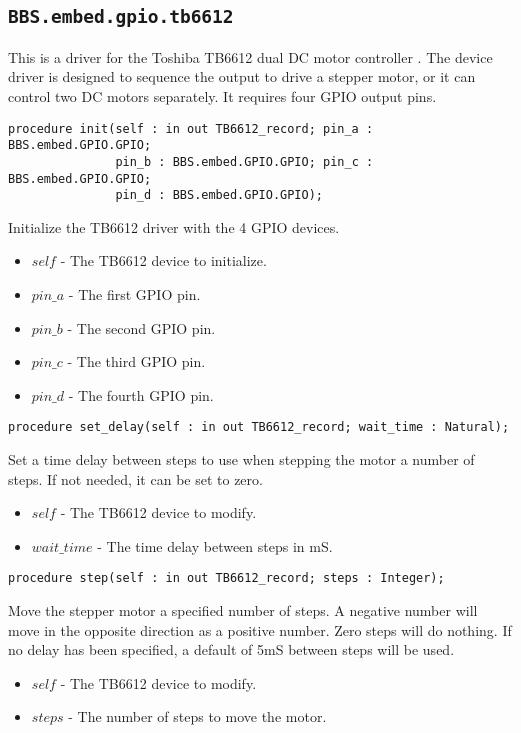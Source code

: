 \documentclass[10pt, openany]{book}
\newcommand{\package}[1]{\texttt{#1}}
\begin{document}
\subsection{\package{BBS.embed.gpio.tb6612}}
This is a driver for the Toshiba TB6612 dual DC motor controller \cite{TB6612}.  The device driver is designed to sequence the output to drive a stepper motor, or it can control two DC motors separately.  It requires four GPIO output pins.

\begin{lstlisting}
procedure init(self : in out TB6612_record; pin_a : BBS.embed.GPIO.GPIO;
               pin_b : BBS.embed.GPIO.GPIO; pin_c : BBS.embed.GPIO.GPIO;
               pin_d : BBS.embed.GPIO.GPIO);
\end{lstlisting}
Initialize the TB6612 driver with the 4 GPIO devices.
\begin{itemize}
  \item $self$ - The TB6612 device to initialize.
  \item $pin\_a$ - The first GPIO pin.
  \item $pin\_b$ - The second GPIO pin.
  \item $pin\_c$ - The third GPIO pin.
  \item $pin\_d$ - The fourth GPIO pin.
\end{itemize}
\begin{lstlisting}
procedure set_delay(self : in out TB6612_record; wait_time : Natural);
\end{lstlisting}
Set a time delay between steps to use when stepping the motor a number of steps.  If not needed, it can be set to zero.
\begin{itemize}
  \item $self$ - The TB6612 device to modify.
  \item $wait\_time$ - The time delay between steps in mS.
\end{itemize}
\begin{lstlisting}
procedure step(self : in out TB6612_record; steps : Integer);
\end{lstlisting}
Move the stepper motor a specified number of steps.  A negative number will move in the opposite direction as a positive number.  Zero steps will do nothing.  If no delay has been specified, a default of 5mS between steps will be used.
\begin{itemize}
  \item $self$ - The TB6612 device to modify.
  \item $steps$ - The number of steps to move the motor.
\end{itemize}
\end{document}
